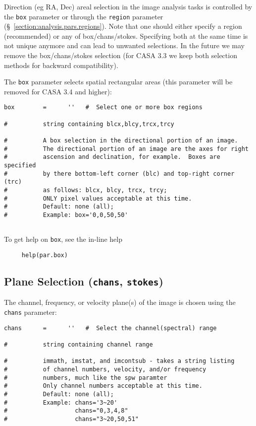Direction (eg RA, Dec) areal selection in the image analysis tasks is
controlled by the {\tt box} parameter or through the {\tt region}
parameter (\S~\ref{section:analysis.pars.regions}). Note that one
should either specify a region (recommended) or any of
box/chans/stokes. Specifying both at the same time is not unique
anymore and can lead to unwanted selections. In the future we may
remove the box/chans/stokes selection (for CASA 3.3 we 
keep both selection methods for backward compatibility).

The {\tt box} parameter selects spatial rectangular areas (this parameter will
be removed for CASA 3.4 and higher):
\small
\begin{verbatim}
box        =      ''   #  Select one or more box regions

#          string containing blcx,blcy,trcx,trcy

#          A box selection in the directional portion of an image.
#          The directional portion of an image are the axes for right
#          ascension and declination, for example.  Boxes are specified
#          by there bottom-left corner (blc) and top-right corner (trc)
#          as follows: blcx, blcy, trcx, trcy;
#          ONLY pixel values acceptable at this time.
#          Default: none (all);
#          Example: box='0,0,50,50'


\end{verbatim}
\normalsize

To get help on {\tt box}, see the in-line help
\small
\begin{verbatim}
     help(par.box)
\end{verbatim}
\normalsize

\subsection{Plane Selection ({\tt chans}, {\tt stokes})}
\label{section:analysis.pars.planes}

The channel, frequency, or velocity plane(s) of the image is chosen
using the {\tt chans} parameter:
\small
\begin{verbatim}
chans      =      ''   #  Select the channel(spectral) range

#          string containing channel range

#          immath, imstat, and imcontsub - takes a string listing
#          of channel numbers, velocity, and/or frequency
#          numbers, much like the spw paramter
#          Only channel numbers acceptable at this time.
#          Default: none (all);  
#          Example: chans='3~20'    
#                   chans="0,3,4,8"
#                   chans="3~20,50,51"
\end{verbatim}
\normalsize

